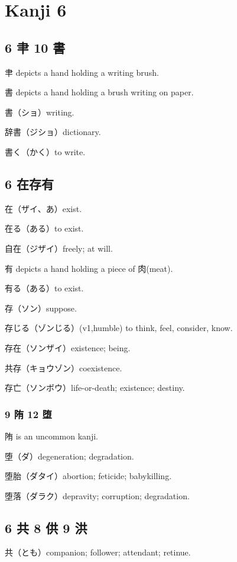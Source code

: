 \chapter{Kanji 6}

\section{6 𦘒 10 書}

𦘒 depicts a hand holding a writing brush.

書 depicts a hand holding a brush writing on paper.

書（ショ）writing.

辞書（ジショ）dictionary.

書く（かく）to write.

\section{6 在存有}

在（ザイ、あ）exist.

在る（ある）to exist.

自在（ジザイ）freely; at will.

有 depicts a hand holding a piece of 肉(meat).

有る（ある）to exist.

存（ソン）suppose.

存じる（ゾンじる）(v1,humble) to think, feel, consider, know.

存在（ソンザイ）existence; being.

共存（キョウゾン）coexistence.

存亡（ソンボウ）life-or-death; existence; destiny.

\subsection{9 陏 12 堕}

陏 is an uncommon kanji.

堕（ダ）degeneration; degradation.

堕胎（ダタイ）abortion; feticide; babykilling.

堕落（ダラク）depravity; corruption; degradation.

\section{6 共 8 供 9 洪}

共（とも）companion; follower; attendant; retinue.

